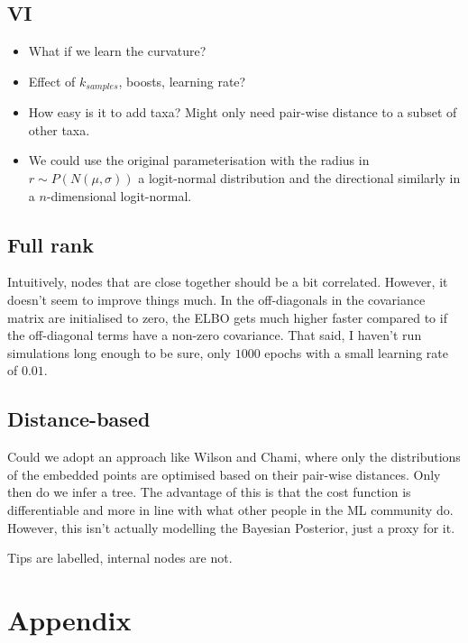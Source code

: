 \documentclass[11pt]{article}
\begin{document}
\subsection{VI}
\begin{itemize}
\item What if we learn the curvature?
\item Effect of $k_{samples}$, boosts, learning rate?
\item How easy is it to add taxa? Might only need pair-wise distance to a subset of other taxa.
\item We could use the original parameterisation with the radius in $r \sim P(N(\mu, \sigma))$ a logit-normal distribution and the directional similarly in a $n$-dimensional logit-normal.
\end{itemize}

\subsection{Full rank}
Intuitively, nodes that are close together should be a bit correlated. However, it doesn't seem to improve things much. In the off-diagonals in the covariance matrix are initialised to zero, the ELBO gets much higher faster compared to if the off-diagonal terms have a non-zero covariance. That said, I haven't run simulations long enough to be sure, only $1000$ epochs with a small learning rate of $0.01$.

\subsection{Distance-based}
Could we adopt an approach like Wilson and Chami, where only the distributions of the embedded points are optimised based on their pair-wise distances.
Only then do we infer a tree.
The advantage of this is that the cost function is differentiable and more in line with what other people in the ML community do.
However, this isn't actually modelling the Bayesian Posterior, just a proxy for it.

Tips are labelled, internal nodes are not.

\section{Appendix}
\end{document}
